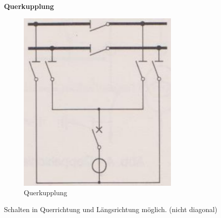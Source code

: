 
\noindent
\begin{minipage}[t]{0.3\textwidth}
    \textbf{Querkupplung}

    \begin{figure}[H]
        \centering
        \includegraphics[width=0.7\textwidth]{./images/10-Schaltanlagen/Querkupplung.png}
        \captionsetup{singlelinecheck=off}
        \caption[Querkupplung]{\newline Querkupplung}
    \end{figure}

    Schalten in Querrichtung und Längsrichtung möglich. (nicht diagonal)
\end{minipage}%
\hspace{0.05\textwidth}%
